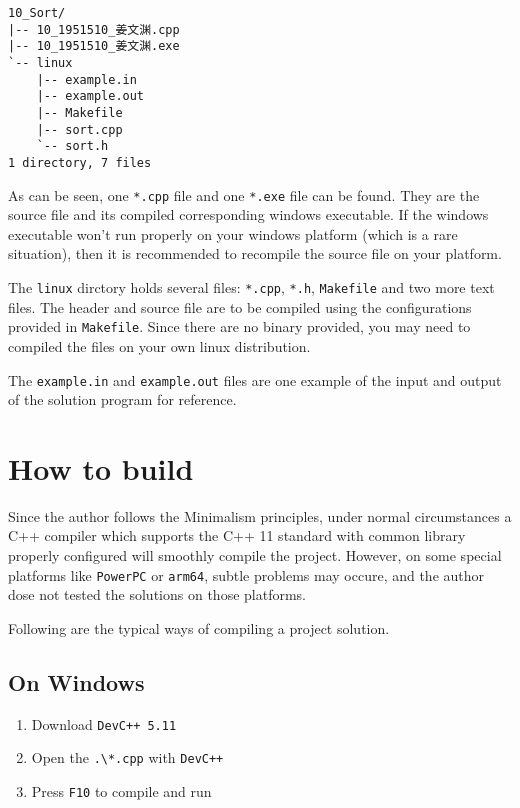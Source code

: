 \documentclass[cn,black,12pt,normal]{elegantnote}
\begin{document}
\begin{lstlisting}
10_Sort/
|-- 10_1951510_姜文渊.cpp
|-- 10_1951510_姜文渊.exe
`-- linux
    |-- example.in
    |-- example.out
    |-- Makefile
    |-- sort.cpp
    `-- sort.h
1 directory, 7 files
\end{lstlisting}

As can be seen, one \lstinline{*.cpp} file and one \lstinline{*.exe} file can be found. They are the source file and its compiled corresponding windows executable. If the windows executable won't run properly on your windows platform (which is a rare situation), then it is recommended to recompile the source file on your platform.

The \lstinline{linux} dirctory holds several files: \lstinline{*.cpp}, \lstinline{*.h}, \lstinline{Makefile} and two more text files. The header and source file are to be compiled using the configurations provided in \lstinline{Makefile}. Since there are no binary provided, you may need to compiled the files on your own linux distribution.

The \lstinline{example.in} and \lstinline{example.out} files are one example of the input and output of the solution program for reference.



\section{How to build}

Since the author follows the Minimalism principles, under normal circumstances a C++ compiler which supports the C++ 11 standard with common library properly configured will smoothly compile the project. However, on some special platforms like \lstinline{PowerPC} or \lstinline{arm64}, subtle problems may occure, and the author dose not tested the solutions on those platforms.

Following are the typical ways of compiling a project solution.

\subsection{On Windows}

\begin{enumerate}
    \item Download \lstinline{DevC++ 5.11}
    \item Open the \lstinline{.\*.cpp} with \lstinline{DevC++}
    \item Press \lstinline{F10} to compile and run
\end{enumerate}
\end{document}
